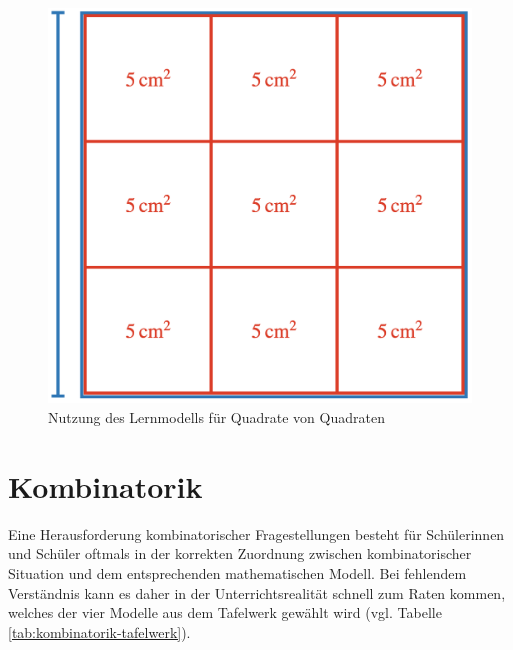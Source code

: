 \documentclass[
]{scrbook}
\theoremstyle{definition}
\theoremstyle{definition}
\theoremstyle{definition}
\theoremstyle{definition}
\theoremstyle{remark}
\begin{document}
\begin{enumerate}
  \begin{figure}

    {\centering \includegraphics[width=0.5\linewidth]{pictures/10-QuadratQuadrat} 

    }

    \caption{Nutzung des Lernmodells für Quadrate von Quadraten}\label{fig:QuadratQuadrat}
    \end{figure}
\end{enumerate}

\hypertarget{kombinatorik}{%
\section{Kombinatorik}\label{kombinatorik}}

Eine Herausforderung kombinatorischer Fragestellungen besteht für Schülerinnen und Schüler oftmals in der korrekten Zuordnung zwischen kombinatorischer Situation und dem entsprechenden mathematischen Modell. Bei fehlendem Verständnis kann es daher in der Unterrichtsrealität schnell zum Raten kommen, welches der vier Modelle aus dem Tafelwerk gewählt wird (vgl. Tabelle \ref{tab:kombinatorik-tafelwerk}).
\end{document}
